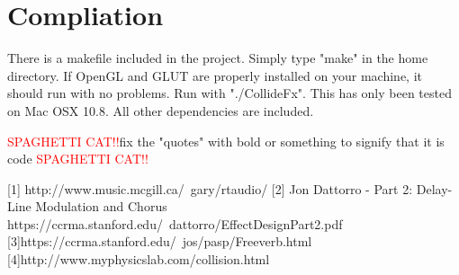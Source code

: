 \documentclass[pdftext,twoside,10pt]{article}
\newcommand{\spag}{\textcolor{red}{SPAGHETTI CAT!!}}
\begin{document}
\section{Compliation}
There is a makefile included in the project. Simply type "make" in the home directory. If OpenGL and GLUT are properly installed on your machine, it should run with no problems. Run with "./CollideFx". This has only been tested on Mac OSX 10.8. All other dependencies are included.



\spag fix the "quotes" with bold or something to signify that it is code \spag

[1] http://www.music.mcgill.ca/~gary/rtaudio/
[2] Jon Dattorro - Part 2: Delay-Line Modulation and Chorus  
https://ccrma.stanford.edu/~dattorro/EffectDesignPart2.pdf 
[3]https://ccrma.stanford.edu/~jos/pasp/Freeverb.html 
[4]http://www.myphysicslab.com/collision.html
\end{document}
